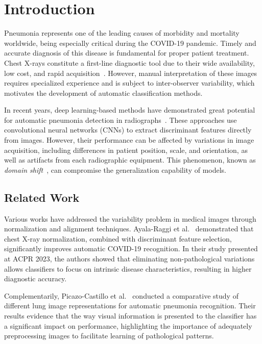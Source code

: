 \documentclass[applsci,article,submit,pdftex,moreauthors]{Definitions/mdpi}
\begin{document}
\section{Introduction}

Pneumonia represents one of the leading causes of morbidity and mortality worldwide, being especially critical during the COVID-19 pandemic. Timely and accurate diagnosis of this disease is fundamental for proper patient treatment. Chest X-rays constitute a first-line diagnostic tool due to their wide availability, low cost, and rapid acquisition~\cite{who2020chest}. However, manual interpretation of these images requires specialized experience and is subject to inter-observer variability, which motivates the development of automatic classification methods.

In recent years, deep learning-based methods have demonstrated great potential for automatic pneumonia detection in radiographs~\cite{rajpurkar2017chexnet,wang2020covidnet,chowdhury2020can}. These approaches use convolutional neural networks (CNNs) to extract discriminant features directly from images. However, their performance can be affected by variations in image acquisition, including differences in patient position, scale, and orientation, as well as artifacts from each radiographic equipment. This phenomenon, known as \textit{domain shift}~\cite{zech2018variable}, can compromise the generalization capability of models.

\subsection{Related Work}

Various works have addressed the variability problem in medical images through normalization and alignment techniques. Ayala-Raggi et al.~\cite{ayala2023synergizing} demonstrated that chest X-ray normalization, combined with discriminant feature selection, significantly improves automatic COVID-19 recognition. In their study presented at ACPR 2023, the authors showed that eliminating non-pathological variations allows classifiers to focus on intrinsic disease characteristics, resulting in higher diagnostic accuracy.

Complementarily, Picazo-Castillo et al.~\cite{picazo2024comparative} conducted a comparative study of different lung image representations for automatic pneumonia recognition. Their results evidence that the way visual information is presented to the classifier has a significant impact on performance, highlighting the importance of adequately preprocessing images to facilitate learning of pathological patterns.
\end{document}

